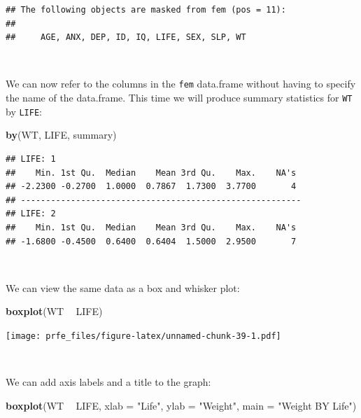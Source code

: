 \documentclass[12pt,a4paper]{book}
\newenvironment{Shaded}{\begin{snugshade}}{\end{snugshade}}
\newcommand{\KeywordTok}[1]{\textcolor[rgb]{0.13,0.29,0.53}{\textbf{#1}}}
\newcommand{\DataTypeTok}[1]{\textcolor[rgb]{0.13,0.29,0.53}{#1}}
\newcommand{\StringTok}[1]{\textcolor[rgb]{0.31,0.60,0.02}{#1}}
\newcommand{\OperatorTok}[1]{\textcolor[rgb]{0.81,0.36,0.00}{\textbf{#1}}}
\newcommand{\NormalTok}[1]{#1}
\theoremstyle{definition}
\theoremstyle{definition}
\theoremstyle{definition}
\theoremstyle{remark}
\begin{document}
\begin{verbatim}
## The following objects are masked from fem (pos = 11):
## 
##     AGE, ANX, DEP, ID, IQ, LIFE, SEX, SLP, WT
\end{verbatim}

~

We can now refer to the columns in the \texttt{fem} data.frame without
having to specify the name of the data.frame. This time we will produce
summary statistics for \texttt{WT} by \texttt{LIFE}:

\begin{Shaded}
\begin{Highlighting}[]
\KeywordTok{by}\NormalTok{(WT, LIFE, summary)}
\end{Highlighting}
\end{Shaded}

\begin{verbatim}
## LIFE: 1
##    Min. 1st Qu.  Median    Mean 3rd Qu.    Max.    NA's 
## -2.2300 -0.2700  1.0000  0.7867  1.7300  3.7700       4 
## -------------------------------------------------------- 
## LIFE: 2
##    Min. 1st Qu.  Median    Mean 3rd Qu.    Max.    NA's 
## -1.6800 -0.4500  0.6400  0.6404  1.5000  2.9500       7
\end{verbatim}

~

We can view the same data as a box and whisker plot:

\begin{Shaded}
\begin{Highlighting}[]
\KeywordTok{boxplot}\NormalTok{(WT }\OperatorTok{~}\StringTok{ }\NormalTok{LIFE)}
\end{Highlighting}
\end{Shaded}

\texttt{[image: prfe\_files/figure-latex/unnamed-chunk-39-1.pdf]}

~

We can add axis labels and a title to the graph:

\begin{Shaded}
\begin{Highlighting}[]
\KeywordTok{boxplot}\NormalTok{(WT }\OperatorTok{~}\StringTok{ }\NormalTok{LIFE,}
        \DataTypeTok{xlab =} \StringTok{"Life"}\NormalTok{,}
        \DataTypeTok{ylab =} \StringTok{"Weight"}\NormalTok{,}
        \DataTypeTok{main =} \StringTok{"Weight BY Life"}\NormalTok{)}
\end{Highlighting}
\end{Shaded}
\end{document}

